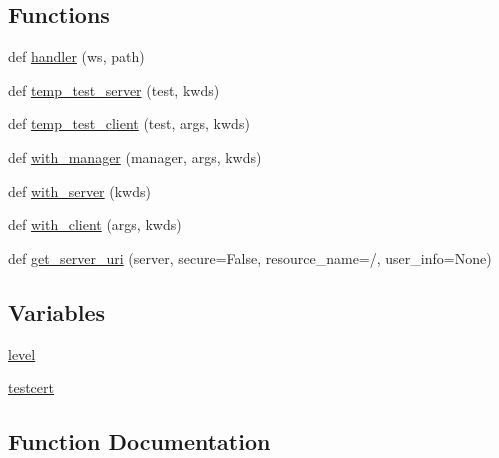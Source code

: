 \subsection*{Functions}
\begin{DoxyCompactItemize}
\item 
def \hyperlink{namespacewebsockets_1_1test__client__server_a13e42f6375e27f142918637259b708cd}{handler} (ws, path)
\item 
def \hyperlink{namespacewebsockets_1_1test__client__server_a48721e7609c27101d82aee90f95b111d}{temp\+\_\+test\+\_\+server} (test, kwds)
\item 
def \hyperlink{namespacewebsockets_1_1test__client__server_a2cbfa658e242b0488352f0e812f8b53f}{temp\+\_\+test\+\_\+client} (test, args, kwds)
\item 
def \hyperlink{namespacewebsockets_1_1test__client__server_ae147154652fd3072d8e207726ac304d9}{with\+\_\+manager} (manager, args, kwds)
\item 
def \hyperlink{namespacewebsockets_1_1test__client__server_adc2855159c14026d788f17b470161818}{with\+\_\+server} (kwds)
\item 
def \hyperlink{namespacewebsockets_1_1test__client__server_a9b26b04fea4457aaaa181bc4329bfb73}{with\+\_\+client} (args, kwds)
\item 
def \hyperlink{namespacewebsockets_1_1test__client__server_acc478c75852fcb3444c0c5ca13bc12a0}{get\+\_\+server\+\_\+uri} (server, secure=False, resource\+\_\+name=\textquotesingle{}/\textquotesingle{}, user\+\_\+info=None)
\end{DoxyCompactItemize}
\subsection*{Variables}
\begin{DoxyCompactItemize}
\item 
\hyperlink{namespacewebsockets_1_1test__client__server_a4fb235df1ed9e88ae3be1848265c69dc}{level}
\item 
\hyperlink{namespacewebsockets_1_1test__client__server_a6567ffdcfd4a252a6b67b58525ab6709}{testcert}
\end{DoxyCompactItemize}


\subsection{Function Documentation}
\mbox{\label{namespacewebsockets_1_1test__client__server_acc478c75852fcb3444c0c5ca13bc12a0}} 
